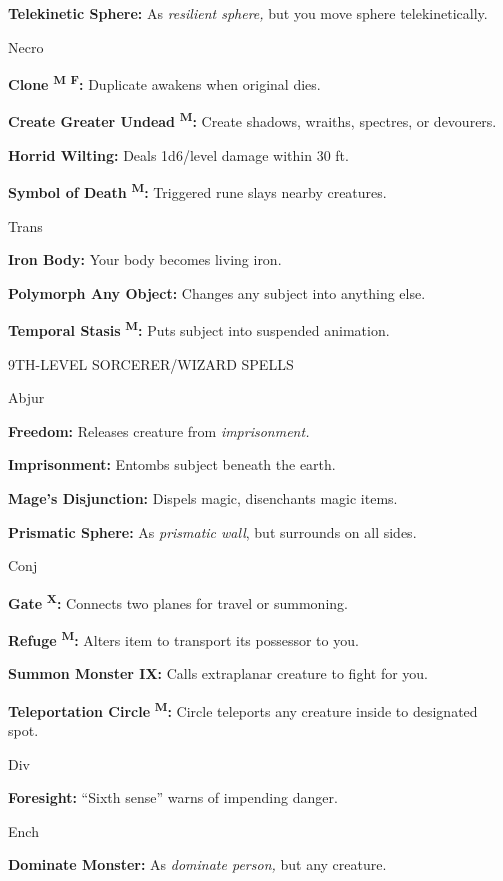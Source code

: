 \documentclass{article}
\begin{document}
\textbf{Telekinetic Sphere:} As\textit{ resilient sphere, }but you move sphere 
telekinetically.

Necro

\textbf{Clone }\textsuperscript{\textbf{M}}{\scriptsize{}\textbf{ }}\textsuperscript{\textbf{F}}\textbf{:} 
Duplicate awakens when original dies.

\textbf{Create Greater Undead }\textsuperscript{\textbf{M}}\textbf{:} Create shadows, 
wraiths, spectres, or devourers.

\textbf{Horrid Wilting:} Deals 1d6/level damage within 30 ft.

\textbf{Symbol of Death }\textsuperscript{\textbf{M}}\textbf{:} Triggered rune 
slays nearby creatures.

Trans

\textbf{Iron Body:} Your body becomes living iron.

\textbf{Polymorph Any Object:} Changes any subject into anything else.

\textbf{Temporal Stasis }\textsuperscript{\textbf{M}}\textbf{:} Puts subject into 
suspended animation.

9TH-LEVEL SORCERER/WIZARD SPELLS

Abjur

\textbf{Freedom:} Releases creature from \textit{imprisonment.}

\textbf{Imprisonment:} Entombs subject beneath the earth.

\textbf{Mage's Disjunction:} Dispels magic, disenchants magic items.

\textbf{Prismatic Sphere:} As \textit{prismatic wall}, but surrounds on all sides.

Conj

\textbf{Gate }\textsuperscript{\textbf{X}}\textbf{:} Connects two planes for travel 
or summoning.

\textbf{Refuge }\textsuperscript{\textbf{M}}\textbf{:} Alters item to transport 
its possessor to you.

\textbf{Summon Monster IX:} Calls extraplanar creature to fight for you.

\textbf{Teleportation Circle }\textsuperscript{\textbf{M}}\textbf{:} Circle teleports 
any creature inside to designated spot.

Div

\textbf{Foresight:} ``Sixth sense'' warns of impending danger.

Ench

\textbf{Dominate Monster:} As \textit{dominate person, }but any creature.
\end{document}
